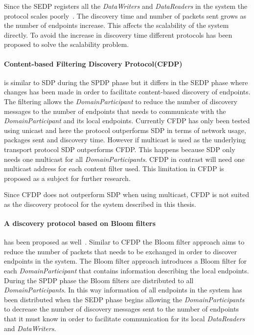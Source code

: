 Since the SEDP registers all the \textit{DataWriters} and \textit{DataReaders} in the system the protocol scales poorly~\cite{(CFDP)}. The discovery time and number of packets sent grows as the number of endpoints increase. This affects the scalability of the system directly. To avoid the increase in discovery time different protocols has been proposed to solve the scalability problem. 

\paragraph{Content-based Filtering Discovery Protocol(CFDP)} is similar to SDP during the SPDP phase but it differs in the SEDP phase where changes has been made in order to facilitate content-based discovery of endpoints. The filtering allows the \textit{DomainParticipant} to reduce the number of discovery messages to the number of endpoints that needs to communicate with the \textit{DomainParticipant} and its local endpoints. Currently CFDP has only been tested using unicast and here the protocol outperforms SDP in terms of network usage, packages sent and discovery time. However if multicast is used as the underlying transport protocol SDP outperforms CFDP. This happens because SDP only needs one multicast for all \textit{DomainParticipants}. CFDP in contrast will need one multicast address for each content filter used. This limitation in CFDP is proposed as a subject for further research.

Since CFDP does not outperform SDP when using multicast, CFDP is not suited as the discovery protocol for the system described in this thesis.

\paragraph{A discovery protocol based on Bloom filters} has been proposed as well~\cite{monedero2009dds}. Similar to CFDP the Bloom filter approach aims to reduce the number of packets that needs to be exchanged in order to discover endpoints in the system. The Bloom filter approach introduces a Bloom filter for each \textit{DomainParticipant} that contains information describing the local endpoints. During the SPDP phase the Bloom filters are distributed to all \textit{DomainParticipants}. In this way information of all endpoints in the system has been distributed when the SEDP phase begins allowing the \textit{DomainParticipants} to decrease the number of discovery messages sent to the number of endpoints that it must know in order to facilitate communication for its local \textit{DataReaders} and \textit{DataWriters}. 

